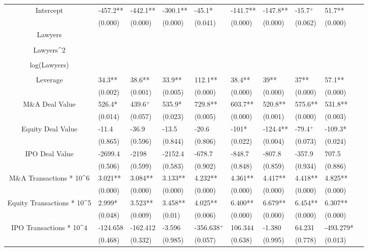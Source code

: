 \documentclass{article}
\begin{document}
\begin{table}[H]
\begin{tabular}{|clllllllll|}
Intercept & -457.2** & -442.1** & -300.1** & -45.1* & -141.7** & -147.8** & -15.7$^{+}$ & 51.7** & \\ 
   & (0.000) & (0.000) & (0.000) & (0.041) & (0.000) & (0.000) & (0.062) & (0.000) & \\ 
  Lawyers &  &  &  &  &  &  &  &  & \\ 
   &  &  &  &  &  &  &  &  & \\ 
  Lawyers^2 &  &  &  &  &  &  &  &  & \\ 
   &  &  &  &  &  &  &  &  & \\ 
  log(Lawyers) &  &  &  &  &  &  &  &  & \\ 
   &  &  &  &  &  &  &  &  & \\ 
  Leverage & 34.3** & 38.6** & 33.9** & 112.1** & 38.4** & 39** & 37** & 57.1** & \\ 
   & (0.002) & (0.001) & (0.005) & (0.000) & (0.000) & (0.000) & (0.000) & (0.000) & \\ 
  M\&A Deal Value & 526.4* & 439.6$^{+}$ & 535.9* & 729.8** & 603.7** & 520.8** & 575.6** & 531.8** & \\ 
   & (0.014) & (0.057) & (0.023) & (0.005) & (0.000) & (0.001) & (0.000) & (0.003) & \\ 
  Equity Deal Value & -11.4 & -36.9 & -13.5 & -20.6 & -101* & -124.4** & -79.4$^{+}$ & -109.3* & \\ 
   & (0.865) & (0.596) & (0.844) & (0.806) & (0.022) & (0.004) & (0.073) & (0.024) & \\ 
  IPO Deal Value & -2699.4 & -2198 & -2152.4 & -678.7 & -848.7 & -807.8 & -357.9 & 707.5 & \\ 
   & (0.506) & (0.599) & (0.583) & (0.902) & (0.848) & (0.859) & (0.934) & (0.886) & \\ 
  M\&A Transactions * 10^6 & 3.021** & 3.084** & 3.133** & 4.232** & 4.361** & 4.417** & 4.418** & 4.825** & \\ 
   & (0.000) & (0.000) & (0.000) & (0.000) & (0.000) & (0.000) & (0.000) & (0.000) & \\ 
  Equity Transactions * 10^5 & 2.999* & 3.523** & 3.458** & 4.025** & 6.400** & 6.679** & 6.454** & 6.307** & \\ 
   & (0.048) & (0.009) & (0.01) & (0.006) & (0.000) & (0.000) & (0.000) & (0.000) & \\ 
  IPO Transactions * 10^4 & -124.658 & -162.412 & -3.596 & -356.638$^{+}$ & 106.344 & -1.380 & 64.231 & -493.279* & \\ 
   & (0.468) & (0.332) & (0.985) & (0.057) & (0.638) & (0.995) & (0.778) & (0.013) & \\ 

\end{tabular}
\end{table}
\end{document}

